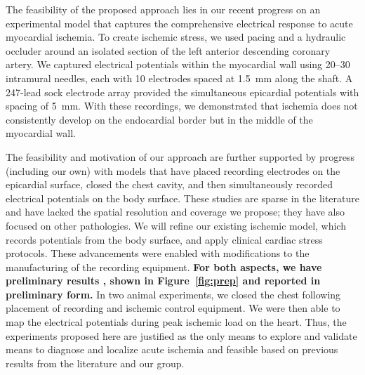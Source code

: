 The feasibility of the proposed approach lies in our recent progress on an
experimental model that captures the comprehensive electrical response to
acute myocardial
ischemia.\cite{BMB:Ara2009,KKA:Ara2014,RSM:Ara2016,BLZ:Zen2018a} To create
 ischemic stress, we used pacing and a hydraulic occluder around an isolated
 section of the left anterior descending coronary artery. We captured
 electrical potentials within the myocardial wall using 20--30 intramural
 needles, each with 10 electrodes spaced at 1.5~mm along the shaft. A  247-lead sock electrode array provided the simultaneous epicardial
 potentials with spacing of 5~mm.\cite{BMB:Ara2009,KKA:Ara2014,RSM:Ara2016}
With these recordings, we demonstrated that ischemia does not consistently
develop on the endocardial border but in the middle of the myocardial
wall.\cite{RSM:Ara2016}

The feasibility and motivation of our approach are further supported by
progress (including our own) with models that have placed recording
electrodes on the epicardial surface, closed the chest cavity, and then
simultaneously recorded electrical potentials on the body
surface.\cite{BLZ:Spa1975,RSM:Bea2015a,BLZ:Clu2017,BLZ:Zen2018a} These
 studies are sparse in the literature and have lacked the spatial resolution
 and coverage we propose; they have also focused on other pathologies.
 We will refine our existing ischemic model,
 which records potentials from
 the body surface, and apply clinical cardiac stress
 protocols.\cite{BLZ:Zen2018a}
These advancements were enabled with modifications to the manufacturing of
the recording equipment. \textbf{For both aspects, we have preliminary
  results , shown in Figure~\ref{fig:prep} and reported in preliminary
  form.}\cite{BLZ:Zen2018a} In two animal experiments, we closed the chest
following placement of recording and ischemic control equipment. We were
then able to map the electrical potentials during peak ischemic load on the
heart. Thus, the experiments proposed here are justified as the only means
 to explore and validate means to diagnose and localize acute ischemia and
 feasible based on previous results from the literature and our group.


